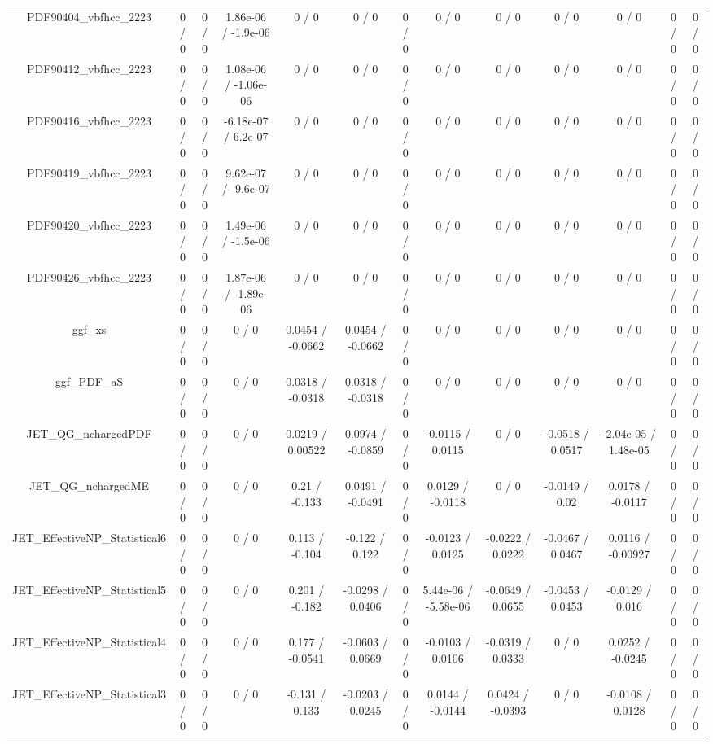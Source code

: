 \documentclass[10pt]{article}
\begin{document}
\begin{table}[htbp]
\begin{center}
\begin{tabular}{|c|c|c|c|c|c|c|c|c|c|c|c|c|}
  PDF90404_vbfhcc_2223 & 0 / 0 & 0 / 0 & 1.86e-06 / -1.9e-06 & 0 / 0 & 0 / 0 & 0 / 0 & 0 / 0 & 0 / 0 & 0 / 0 & 0 / 0 & 0 / 0 & 0 / 0 \\ 
  PDF90412_vbfhcc_2223 & 0 / 0 & 0 / 0 & 1.08e-06 / -1.06e-06 & 0 / 0 & 0 / 0 & 0 / 0 & 0 / 0 & 0 / 0 & 0 / 0 & 0 / 0 & 0 / 0 & 0 / 0 \\ 
  PDF90416_vbfhcc_2223 & 0 / 0 & 0 / 0 & -6.18e-07 / 6.2e-07 & 0 / 0 & 0 / 0 & 0 / 0 & 0 / 0 & 0 / 0 & 0 / 0 & 0 / 0 & 0 / 0 & 0 / 0 \\ 
  PDF90419_vbfhcc_2223 & 0 / 0 & 0 / 0 & 9.62e-07 / -9.6e-07 & 0 / 0 & 0 / 0 & 0 / 0 & 0 / 0 & 0 / 0 & 0 / 0 & 0 / 0 & 0 / 0 & 0 / 0 \\ 
  PDF90420_vbfhcc_2223 & 0 / 0 & 0 / 0 & 1.49e-06 / -1.5e-06 & 0 / 0 & 0 / 0 & 0 / 0 & 0 / 0 & 0 / 0 & 0 / 0 & 0 / 0 & 0 / 0 & 0 / 0 \\ 
  PDF90426_vbfhcc_2223 & 0 / 0 & 0 / 0 & 1.87e-06 / -1.89e-06 & 0 / 0 & 0 / 0 & 0 / 0 & 0 / 0 & 0 / 0 & 0 / 0 & 0 / 0 & 0 / 0 & 0 / 0 \\ 
  ggf_xs & 0 / 0 & 0 / 0 & 0 / 0 & 0.0454 / -0.0662 & 0.0454 / -0.0662 & 0 / 0 & 0 / 0 & 0 / 0 & 0 / 0 & 0 / 0 & 0 / 0 & 0 / 0 \\ 
  ggf_PDF_aS & 0 / 0 & 0 / 0 & 0 / 0 & 0.0318 / -0.0318 & 0.0318 / -0.0318 & 0 / 0 & 0 / 0 & 0 / 0 & 0 / 0 & 0 / 0 & 0 / 0 & 0 / 0 \\ 
  JET_QG_nchargedPDF & 0 / 0 & 0 / 0 & 0 / 0 & 0.0219 / 0.00522 & 0.0974 / -0.0859 & 0 / 0 & -0.0115 / 0.0115 & 0 / 0 & -0.0518 / 0.0517 & -2.04e-05 / 1.48e-05 & 0 / 0 & 0 / 0 \\ 
  JET_QG_nchargedME & 0 / 0 & 0 / 0 & 0 / 0 & 0.21 / -0.133 & 0.0491 / -0.0491 & 0 / 0 & 0.0129 / -0.0118 & 0 / 0 & -0.0149 / 0.02 & 0.0178 / -0.0117 & 0 / 0 & 0 / 0 \\ 
  JET_EffectiveNP_Statistical6 & 0 / 0 & 0 / 0 & 0 / 0 & 0.113 / -0.104 & -0.122 / 0.122 & 0 / 0 & -0.0123 / 0.0125 & -0.0222 / 0.0222 & -0.0467 / 0.0467 & 0.0116 / -0.00927 & 0 / 0 & 0 / 0 \\ 
  JET_EffectiveNP_Statistical5 & 0 / 0 & 0 / 0 & 0 / 0 & 0.201 / -0.182 & -0.0298 / 0.0406 & 0 / 0 & 5.44e-06 / -5.58e-06 & -0.0649 / 0.0655 & -0.0453 / 0.0453 & -0.0129 / 0.016 & 0 / 0 & 0 / 0 \\ 
  JET_EffectiveNP_Statistical4 & 0 / 0 & 0 / 0 & 0 / 0 & 0.177 / -0.0541 & -0.0603 / 0.0669 & 0 / 0 & -0.0103 / 0.0106 & -0.0319 / 0.0333 & 0 / 0 & 0.0252 / -0.0245 & 0 / 0 & 0 / 0 \\ 
  JET_EffectiveNP_Statistical3 & 0 / 0 & 0 / 0 & 0 / 0 & -0.131 / 0.133 & -0.0203 / 0.0245 & 0 / 0 & 0.0144 / -0.0144 & 0.0424 / -0.0393 & 0 / 0 & -0.0108 / 0.0128 & 0 / 0 & 0 / 0 \\ 

\end{tabular}
\end{center}
\end{table}
\end{document}
